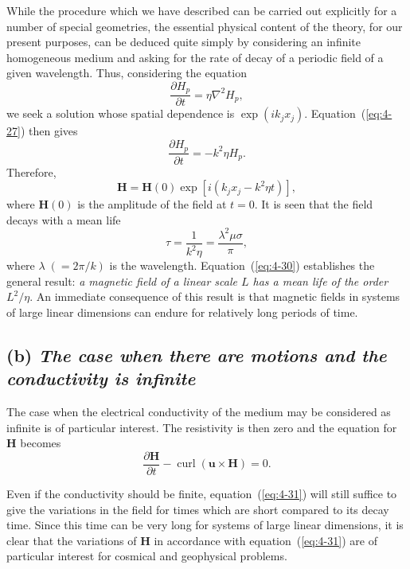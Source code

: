 While the procedure which we have described can be carried out explicitly for a number of special geometries, the essential physical content of the theory, for our present purposes, can be deduced quite simply by considering an infinite homogeneous medium and asking for the rate of decay of a periodic field of a given wavelength. Thus, considering the equation
\begin{equation}
\label{eq:4-27}
\frac{\partial H_p}{\partial t} = \eta\nabla^2 H_p,
\end{equation}
we seek a solution whose spatial dependence is $\exp(ik_j x_j)$. Equation~(\ref{eq:4-27}) then gives
\begin{equation}
\label{eq:4-28}
\frac{\partial H_p}{\partial t} = -k^2\eta H_p.
\end{equation}
Therefore,
\begin{equation}
\label{eq:4-29}
\mathbf{H} = \mathbf{H}(0)\exp[i(k_j x_j-k^2\eta t)],
\end{equation}
where $\mathbf{H}(0)$ is the amplitude of the field at $t=0$. It is seen that the field decays with a mean life
\begin{equation}
\label{eq:4-30}
\tau = \frac{1}{k^2\eta} = \frac{\lambda^2\mu\sigma}{\pi},
\end{equation}
where $\lambda\;(=2\pi/k)$ is the wavelength. Equation~(\ref{eq:4-30}) establishes the general result: \emph{a magnetic field of a linear scale $L$ has a mean life of the order $L^2/\eta$}. An immediate consequence of this result is that magnetic fields in systems of large linear dimensions can endure for relatively long periods of time.

\subsection*{(b) \emph{The case when there are motions and the conductivity is infinite}}

The case when the electrical conductivity of the medium may be considered as infinite is of particular interest. The resistivity is then zero and the equation for $\mathbf{H}$ becomes
\begin{equation}
\label{eq:4-31}
\frac{\partial\mathbf{H}}{\partial t}-\operatorname{curl}(\mathbf{u}\times\mathbf{H}) = 0.
\end{equation}

Even if the conductivity should be finite, equation~(\ref{eq:4-31}) will still suffice to give the variations in the field for times which are short compared to its decay time. Since this time can be very long for systems of large linear dimensions, it is clear that the variations of $\mathbf{H}$ in accordance with equation~(\ref{eq:4-31}) are of particular interest for cosmical and geophysical problems.


